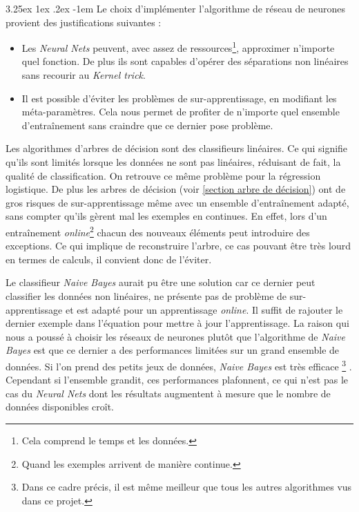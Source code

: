 \documentclass[a4paper, 11pt]{article}
\makeatletter
\renewcommand\paragraph{\@startsection{paragraph}{5}{\z@}%
  {3.25ex \@plus1ex \@minus.2ex}%
  {-1em}%
  {\normalfont\normalsize\bfseries}}
\makeatother
\begin{document}
\paragraph{}
Le choix d'implémenter l'algorithme de réseau de neurones provient des justifications suivantes :
\begin{itemize}
 \item Les \textit{Neural Nets} peuvent, avec assez de ressources\footnote{Cela comprend le temps et les données.}, approximer n'importe
 quel fonction. De plus ils sont capables d'opérer des séparations non linéaires sans recourir au \textit{Kernel trick}.
 \item Il est possible d'éviter les problèmes de sur-apprentissage, en modifiant les méta-paramètres. Cela nous permet de profiter
 de n'importe quel ensemble d'entraînement sans craindre que ce dernier pose problème.
\end{itemize}

Les algorithmes d'arbres de décision sont des classifieurs linéaires. Ce qui signifie qu'ils sont limités
lorsque les données ne sont pas linéaires, réduisant de fait, la qualité de classification. On retrouve ce même problème
pour la régression logistique. De plus les arbres de décision (voir \ref{section arbre de décision}) ont de gros risques
de sur-apprentissage même avec un ensemble d'entraînement adapté, sans compter qu'ils gèrent mal les exemples en continues.
En effet, lors d'un entraînement \textit{online}\footnote{Quand les exemples arrivent de manière continue.} chacun des nouveaux
éléments peut introduire des exceptions. Ce qui implique de reconstruire l'arbre, ce cas pouvant être très lourd en termes
de calculs, il convient donc de l'éviter.

Le classifieur \textit{Naive Bayes} aurait pu être une solution car ce dernier peut classifier les données non linéaires,
ne présente pas de problème de sur-apprentissage et est adapté pour un apprentissage \textit{online}. Il suffit de rajouter le
dernier exemple dans l'équation pour mettre à jour l'apprentissage. La raison qui nous a poussé à choisir les réseaux de neurones 
plutôt que l'algorithme de \textit{Naive Bayes} est que ce dernier a des performances limitées sur un grand ensemble de données.
Si l'on prend des petits jeux de données, \textit{Naive Bayes} est très efficace
\footnote{Dans ce cadre précis, il est même meilleur que tous les autres algorithmes vus dans ce projet.}
\cite{ml_petites_donnees}.
Cependant si l'ensemble grandit, ces performances plafonnent, ce qui n'est pas le cas du \textit{Neural Nets} dont les
résultats augmentent à mesure que le nombre de données disponibles croît.
\end{document}
